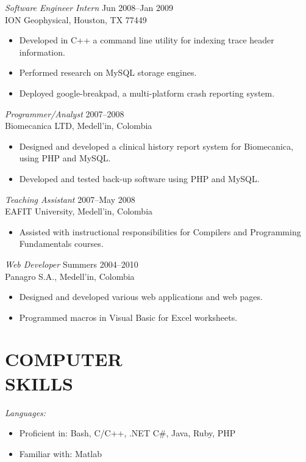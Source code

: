 \documentclass[line,margin]{res}
\begin{document}
\begin{resume}
{\sl Software Engineer Intern} \hfill Jun 2008--Jan 2009\\
ION Geophysical, Houston, TX 77449
\begin{itemize} \itemsep -2pt
    \item Developed in C++ a command line utility for indexing trace header information.
    \item Performed research on MySQL storage engines.
    \item Deployed google-breakpad, a multi-platform crash reporting system.
\end{itemize}

{\sl Programmer/Analyst} \hfill 2007--2008\\
Biomecanica LTD, Medell\a'in, Colombia
\begin{itemize} \itemsep -2pt
    \item Designed and developed a clinical history report system for Biomecanica, using PHP and MySQL.
    \item Developed and tested back-up software using PHP and MySQL.
\end{itemize}

{\sl Teaching Assistant} \hfill 2007--May 2008\\
EAFIT University, Medell\a'in, Colombia
\begin{itemize} \itemsep -2pt
    \item  Assisted with instructional responsibilities for Compilers and Programming Fundamentals courses.
\end{itemize}

{\sl Web Developer} \hfill Summers  2004--2010\\
Panagro S.A., Medell\a'in, Colombia
\begin{itemize} \itemsep -2pt
    \item Designed and developed various web applications and web pages.  
    \item Programmed macros in Visual Basic for Excel worksheets.
\end{itemize}

 
\section{ COMPUTER \\ SKILLS} %
\label{sec:computer_skills}
    {\sl Languages:}
    \begin{itemize} \itemsep -2pt
        \item Proficient in: Bash, C/C++, .NET C\#, Java, Ruby, PHP 
        \item Familiar with: Matlab
    \end{itemize}


\end{resume}
\end{document}

